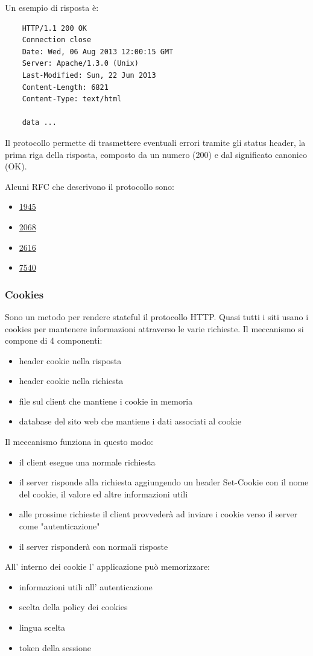 Un esempio di risposta è:
\begin{verbatim}
    HTTP/1.1 200 OK
    Connection close
    Date: Wed, 06 Aug 2013 12:00:15 GMT
    Server: Apache/1.3.0 (Unix)
    Last-Modified: Sun, 22 Jun 2013
    Content-Length: 6821
    Content-Type: text/html
    
    data ...
\end{verbatim}

Il protocollo permette di trasmettere eventuali errori tramite gli status header, la prima riga della risposta, composto da un numero (200) e dal significato canonico (OK).

Alcuni RFC che descrivono il protocollo sono:
\begin{itemize}
    \item \href{https://datatracker.ietf.org/doc/html/rfc1945}{1945}
    \item \href{https://datatracker.ietf.org/doc/html/rfc2068}{2068}
    \item \href{https://datatracker.ietf.org/doc/html/rfc2616}{2616}
    \item \href{https://datatracker.ietf.org/doc/html/rfc7230}{7540}
\end{itemize}

\subsubsection{Cookies}
Sono un metodo per rendere stateful il protocollo HTTP.
Quasi tutti i siti usano i cookies per mantenere informazioni attraverso le varie richieste.
Il meccanismo si compone di 4 componenti:
\begin{itemize}
    \item header cookie nella risposta
    \item header cookie nella richiesta
    \item file sul client che mantiene i cookie in memoria
    \item database del sito web che mantiene i dati associati al cookie
\end{itemize}
Il meccanismo funziona in questo modo:
\begin{itemize}
    \item il client esegue una normale richiesta
    \item il server risponde alla richiesta aggiungendo un header Set-Cookie con il nome del cookie, il valore ed altre informazioni utili
    \item alle prossime richieste il client provvederà ad inviare i cookie verso il server come "autenticazione"
    \item il server risponderà con normali risposte
\end{itemize}
All' interno dei cookie l' applicazione può memorizzare:
\begin{itemize}
    \item informazioni utili all' autenticazione
    \item scelta della policy dei cookies
    \item lingua scelta
    \item token della sessione
\end{itemize}

